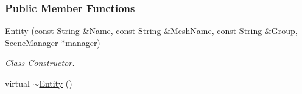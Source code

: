 \subsubsection*{Public Member Functions}
\begin{DoxyCompactItemize}
\item 
\hyperlink{classMezzanine_1_1Entity_a50fb69d94709026fc524cd0cbe3671b8}{Entity} (const \hyperlink{namespaceMezzanine_acf9fcc130e6ebf08e3d8491aebcf1c86}{String} \&Name, const \hyperlink{namespaceMezzanine_acf9fcc130e6ebf08e3d8491aebcf1c86}{String} \&MeshName, const \hyperlink{namespaceMezzanine_acf9fcc130e6ebf08e3d8491aebcf1c86}{String} \&Group, \hyperlink{classMezzanine_1_1SceneManager}{SceneManager} $\ast$manager)
\begin{DoxyCompactList}\small\item\em Class Constructor. \item\end{DoxyCompactList}\item 
\hypertarget{classMezzanine_1_1Entity_a030c609ef574de6f3c1e474dfe119e48}{
virtual \hyperlink{classMezzanine_1_1Entity_a030c609ef574de6f3c1e474dfe119e48}{$\sim$Entity} ()}
\label{classMezzanine_1_1Entity_a030c609ef574de6f3c1e474dfe119e48}


\end{DoxyCompactItemize}

